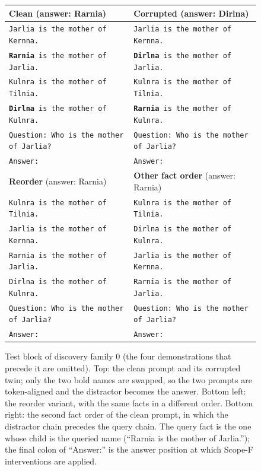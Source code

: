 \begin{figure}[t]
\centering\scriptsize
\setlength{\tabcolsep}{8pt}
\begin{tabular}{@{}p{}p{}@{}}
\toprule
\textbf{Clean} (answer: Rarnia) & \textbf{Corrupted} (answer: Dirlna) \\
\midrule
\texttt{Jarlia is the mother of Kernna.} & \texttt{Jarlia is the mother of Kernna.} \\
\texttt{\textbf{Rarnia} is the mother of Jarlia.} & \texttt{\textbf{Dirlna} is the mother of Jarlia.} \\
\texttt{Kulnra is the mother of Tilnia.} & \texttt{Kulnra is the mother of Tilnia.} \\
\texttt{\textbf{Dirlna} is the mother of Kulnra.} & \texttt{\textbf{Rarnia} is the mother of Kulnra.} \\
\texttt{Question: Who is the mother of Jarlia?} & \texttt{Question: Who is the mother of Jarlia?} \\
\texttt{Answer:} & \texttt{Answer:} \\
\midrule
\textbf{Reorder} (answer: Rarnia) & \textbf{Other fact order} (answer: Rarnia) \\
\midrule
\texttt{Kulnra is the mother of Tilnia.} & \texttt{Kulnra is the mother of Tilnia.} \\
\texttt{Jarlia is the mother of Kernna.} & \texttt{Dirlna is the mother of Kulnra.} \\
\texttt{Rarnia is the mother of Jarlia.} & \texttt{Jarlia is the mother of Kernna.} \\
\texttt{Dirlna is the mother of Kulnra.} & \texttt{Rarnia is the mother of Jarlia.} \\
\texttt{Question: Who is the mother of Jarlia?} & \texttt{Question: Who is the mother of Jarlia?} \\
\texttt{Answer:} & \texttt{Answer:} \\
\bottomrule
\end{tabular}
\caption{Test block of discovery family 0 (the four demonstrations that precede it
are omitted). Top: the clean prompt and its corrupted twin; only the two bold names
are swapped, so the two prompts are token-aligned and the distractor becomes the
answer. Bottom left: the reorder variant, with the same facts in a different order.
Bottom right: the second fact order of the clean prompt, in which the distractor
chain precedes the query chain. The query fact is the one whose child is the queried
name (``Rarnia is the mother of Jarlia.''); the final colon of ``Answer:'' is the
answer position at which Scope-F interventions are applied.}
\label{fig:data}
\end{figure}

